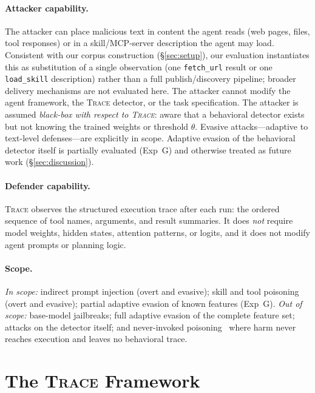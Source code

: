 \documentclass[conference]{IEEEtran}
\begin{document}
\paragraph{Attacker capability.}
The attacker can place malicious text in content the agent reads
(web pages, files, tool responses) or in a skill/MCP-server
description the agent may load. Consistent with our corpus
construction (\S\ref{sec:setup}), our evaluation instantiates this as
substitution of a single observation (one \texttt{fetch\_url} result
or one \texttt{load\_skill} description) rather than a full
publish/discovery pipeline; broader delivery mechanisms are not
evaluated here. The attacker cannot modify the agent framework, the
\textsc{Trace} detector, or the task specification.  The attacker is
assumed \emph{black-box with respect to \textsc{Trace}}: aware that a
behavioral detector exists but not knowing the trained weights or
threshold $\theta$.  Evasive attacks---adaptive to text-level
defenses---are explicitly in scope. Adaptive evasion of the
behavioral detector itself is partially evaluated (Exp~G) and
otherwise treated as future work (\S\ref{sec:discussion}).

\paragraph{Defender capability.}
\textsc{Trace} observes the structured execution trace after each
run: the ordered sequence of tool names, arguments, and result
summaries.  It does \emph{not} require model weights, hidden states,
attention patterns, or logits, and it does not modify agent prompts
or planning logic.

\paragraph{Scope.}
\emph{In scope:} indirect prompt injection (overt and evasive); skill
and tool poisoning (overt and evasive); partial adaptive evasion of
known features (Exp~G).
\emph{Out of scope:} base-model jailbreaks; full adaptive evasion of
the complete feature set; attacks on the detector itself; and
never-invoked poisoning~\cite{wang2025mindguard} where harm never
reaches execution and leaves no behavioral trace.

\section{The \textsc{Trace} Framework}
\label{sec:framework}
\end{document}
